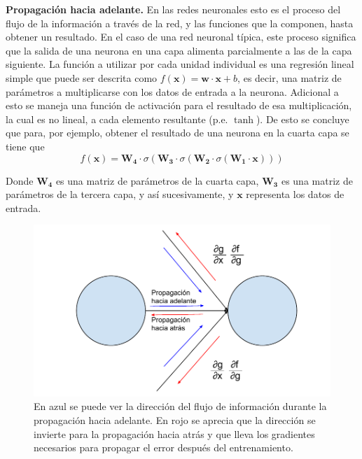 \textbf{Propagación hacia adelante.} En las redes neuronales esto es el proceso del flujo de la información a través de la red, y las funciones que la componen, hasta obtener un resultado. En el caso de una red neuronal típica, este proceso significa que la salida de una neurona en una capa alimenta parcialmente a las de la capa siguiente. La función a utilizar por cada unidad individual es una regresión lineal simple que puede ser descrita como $f(\mathbf{x}) = \mathbf{w} \cdot \mathbf{x} + b$, es decir, una matriz de parámetros a multiplicarse con los datos de entrada a la neurona. Adicional a esto se maneja una función de activación para el resultado de esa multiplicación, la cual es no lineal, a cada elemento resultante (p.e. $\tanh$). De esto se concluye que para, por ejemplo, obtener el resultado de una neurona en la cuarta capa se tiene que
\begin{equation}
\label{eq:feedfwdeq}
f(\mathbf{x}) = \mathbf{W_4} \cdot \sigma(\mathbf{W_3} \cdot \sigma (\mathbf{W_2} \cdot \sigma(\mathbf{W_1} \cdot \mathbf{x})))
\end{equation}

Donde $\mathbf{W_4}$ es una matriz de parámetros de la cuarta capa, $\mathbf{W_3}$ es una matriz de parámetros de la tercera capa, y así sucesivamente, y $\mathbf{x}$ representa los datos de entrada.

\begin{figure}
\includegraphics[scale=0.8]{Figures/backprop.pdf}
\caption{En azul se puede ver la dirección del flujo de información durante la propagación hacia adelante. En rojo se aprecia que la dirección se invierte para la propagación hacia atrás y que lleva los gradientes necesarios para propagar el error después del entrenamiento.}
\label{fig:backprop}
\end{figure}


